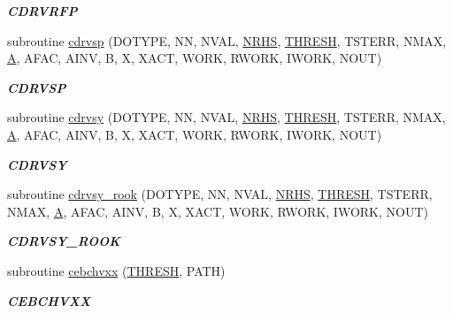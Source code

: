\begin{DoxyCompactItemize}
\begin{DoxyCompactList}\small\item\em {\bfseries C\+D\+R\+V\+R\+F\+P} \end{DoxyCompactList}\item 
subroutine \hyperlink{group__complex__lin_ga70e0f5ceacf233440f69741c5720014b}{cdrvsp} (D\+O\+T\+Y\+P\+E, N\+N, N\+V\+A\+L, \hyperlink{example__user_8c_aa0138da002ce2a90360df2f521eb3198}{N\+R\+H\+S}, \hyperlink{zlaqgs_8c_a0656018abfc9fa2821827415f5d5ea57}{T\+H\+R\+E\+S\+H}, T\+S\+T\+E\+R\+R, N\+M\+A\+X, \hyperlink{classA}{A}, A\+F\+A\+C, A\+I\+N\+V, B, X, X\+A\+C\+T, W\+O\+R\+K, R\+W\+O\+R\+K, I\+W\+O\+R\+K, N\+O\+U\+T)
\begin{DoxyCompactList}\small\item\em {\bfseries C\+D\+R\+V\+S\+P} \end{DoxyCompactList}\item 
subroutine \hyperlink{group__complex__lin_ga07e009f5cdc737967fde080b95d56525}{cdrvsy} (D\+O\+T\+Y\+P\+E, N\+N, N\+V\+A\+L, \hyperlink{example__user_8c_aa0138da002ce2a90360df2f521eb3198}{N\+R\+H\+S}, \hyperlink{zlaqgs_8c_a0656018abfc9fa2821827415f5d5ea57}{T\+H\+R\+E\+S\+H}, T\+S\+T\+E\+R\+R, N\+M\+A\+X, \hyperlink{classA}{A}, A\+F\+A\+C, A\+I\+N\+V, B, X, X\+A\+C\+T, W\+O\+R\+K, R\+W\+O\+R\+K, I\+W\+O\+R\+K, N\+O\+U\+T)
\begin{DoxyCompactList}\small\item\em {\bfseries C\+D\+R\+V\+S\+Y} \end{DoxyCompactList}\item 
subroutine \hyperlink{group__complex__lin_ga0c6cea54248fb9399512c7f2ae565d5a}{cdrvsy\+\_\+rook} (D\+O\+T\+Y\+P\+E, N\+N, N\+V\+A\+L, \hyperlink{example__user_8c_aa0138da002ce2a90360df2f521eb3198}{N\+R\+H\+S}, \hyperlink{zlaqgs_8c_a0656018abfc9fa2821827415f5d5ea57}{T\+H\+R\+E\+S\+H}, T\+S\+T\+E\+R\+R, N\+M\+A\+X, \hyperlink{classA}{A}, A\+F\+A\+C, A\+I\+N\+V, B, X, X\+A\+C\+T, W\+O\+R\+K, R\+W\+O\+R\+K, I\+W\+O\+R\+K, N\+O\+U\+T)
\begin{DoxyCompactList}\small\item\em {\bfseries C\+D\+R\+V\+S\+Y\+\_\+\+R\+O\+O\+K} \end{DoxyCompactList}\item 
subroutine \hyperlink{group__complex__lin_ga9a19776f16c483e0f844b5843326a5a6}{cebchvxx} (\hyperlink{zlaqgs_8c_a0656018abfc9fa2821827415f5d5ea57}{T\+H\+R\+E\+S\+H}, P\+A\+T\+H)
\begin{DoxyCompactList}\small\item\em {\bfseries C\+E\+B\+C\+H\+V\+X\+X} \end{DoxyCompactList}\item 

\end{DoxyCompactItemize}
